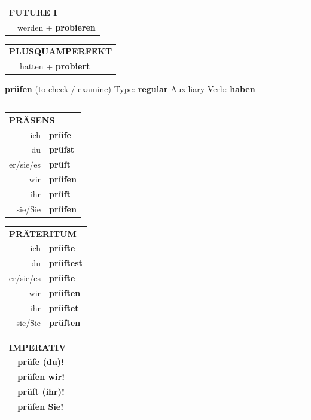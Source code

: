 \documentclass[10pt,a4paper]{revtex4-2}
\begin{document}
\begin{verbbox-acc}
\begin{tabular}{rl}
    \multicolumn{2}{l}{\textbf{FUTURE I} }\\
   & werden + \textbf{probieren}\\
 
  \end{tabular}
\hfill
   \begin{tabular}{rl}
      \multicolumn{2}{l}{\textbf{PLUSQUAMPERFEKT}}\\
   & hatten + \textbf{probiert}\\
  \end{tabular}
  
  \vspace{-5pt}


\end{verbbox-acc}

\begin{verbbox}
{\Large \bf prüfen} (to check / examine) \hfill Type: \textbf{regular} \hfill Auxiliary Verb: \textbf{haben}

\vspace{5pt}
\hrule
\vspace{5pt}

\begin{tabular}{rl}
\multicolumn{2}{l}{\textbf{PRÄSENS}}\\
ich & \textbf{prüfe}\\
du & \textbf{prüfst}\\
er/sie/es & \textbf{prüft}\\
wir & \textbf{prüfen}\\
ihr & \textbf{prüft}\\
sie/Sie & \textbf{prüfen}\\
\end{tabular}
\hfill
\begin{tabular}{rl}
\multicolumn{2}{l}{\textbf{PRÄTERITUM}}\\
ich & \textbf{prüfte}\\
du & \textbf{prüftest}\\
er/sie/es & \textbf{prüfte}\\
wir & \textbf{prüften}\\
ihr & \textbf{prüftet}\\
sie/Sie & \textbf{prüften}\\
\end{tabular}
\hfill
\begin{tabular}{rl}
\multicolumn{2}{l}{\textbf{IMPERATIV}}\\
& \textbf{prüfe (du)!}\\
& \textbf{prüfen wir!}\\
& \textbf{prüft (ihr)!}\\
& \textbf{prüfen Sie!}\\
\end{tabular}


\end{verbbox}
\end{document}
